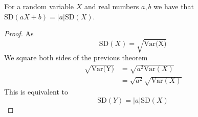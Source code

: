 \begin{theorem}
  For a random variable $X$ and real numbers $a,b$ we have that $\text{SD}(aX+b)=|a|\text{SD}(X)$.
\end{theorem}
\begin{proof}
  As
  \[
      \text{SD}(X)=\sqrt{\text{Var(X)}}
  \]
  We square both sides of the previous theorem
  \begin{align*}
      \sqrt{\text{Var(Y)}}&=\sqrt{a^{2}\text{Var}(X)} \\
                  &=\sqrt{a^{2}}\sqrt{\text{Var}(X)}
  \end{align*}
  This is equivalent to
  \[
      \text{SD}(Y)=|a|\text{SD}(X)
  \]
\end{proof}
